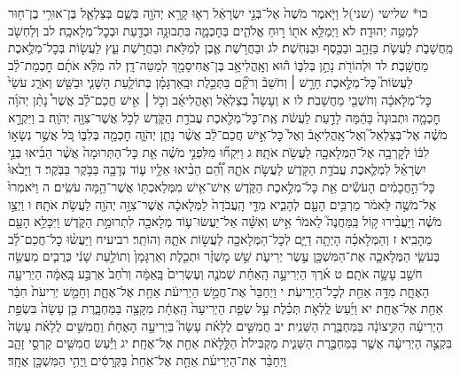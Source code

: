 \documentclass[twoside, openany, parskip=half, 11pt]{book}
\begin{document}
כו* שלישי (שני)ל וַיֹּ֤אמֶר מֹשֶׁה֙ אֶל־בְּנֵ֣י יִשְׂרָאֵ֔ל רְא֛וּ קָרָ֥א יְהֹוָ֖ה בְּשֵׁ֑ם בְּצַלְאֵ֛ל בֶּן־אוּרִ֥י בֶן־ח֖וּר לְמַטֵּ֥ה יְהוּדָֽה׃ לא וַיְמַלֵּ֥א אֹת֖וֹ ר֣וּחַ אֱלֹהִ֑ים בְּחׇכְמָ֛ה בִּתְבוּנָ֥ה וּבְדַ֖עַת וּבְכׇל־מְלָאכָֽה׃ לב וְלַחְשֹׁ֖ב מַֽחֲשָׁבֹ֑ת לַעֲשֹׂ֛ת בַּזָּהָ֥ב וּבַכֶּ֖סֶף וּבַנְּחֹֽשֶׁת׃ לג וּבַחֲרֹ֥שֶׁת אֶ֛בֶן לְמַלֹּ֖את וּבַחֲרֹ֣שֶׁת עֵ֑ץ לַעֲשׂ֖וֹת בְּכׇל־מְלֶ֥אכֶת מַחֲשָֽׁבֶת׃ לד וּלְהוֹרֹ֖ת נָתַ֣ן בְּלִבּ֑וֹ ה֕וּא וְאׇֽהֳלִיאָ֥ב בֶּן־אֲחִיסָמָ֖ךְ לְמַטֵּה־דָֽן׃ לה מִלֵּ֨א אֹתָ֜ם חׇכְמַת־לֵ֗ב לַעֲשׂוֹת֮ כׇּל־מְלֶ֣אכֶת חָרָ֣שׁ ׀ וְחֹשֵׁב֒ וְרֹקֵ֞ם בַּתְּכֵ֣לֶת וּבָֽאַרְגָּמָ֗ן בְּתוֹלַ֧עַת הַשָּׁנִ֛י וּבַשֵּׁ֖שׁ וְאֹרֵ֑ג עֹשֵׂי֙ כׇּל־מְלָאכָ֔ה וְחֹשְׁבֵ֖י מַחֲשָׁבֹֽת׃ לו א וְעָשָׂה֩ בְצַלְאֵ֨ל וְאׇהֳלִיאָ֜ב וְכֹ֣ל ׀ אִ֣ישׁ חֲכַם־לֵ֗ב אֲשֶׁר֩ נָתַ֨ן יְהֹוָ֜ה חׇכְמָ֤ה וּתְבוּנָה֙ בָּהֵ֔מָּה לָדַ֣עַת לַעֲשֹׂ֔ת אֶֽת־כׇּל־מְלֶ֖אכֶת עֲבֹדַ֣ת הַקֹּ֑דֶשׁ לְכֹ֥ל אֲשֶׁר־צִוָּ֖ה יְהֹוָֽה׃ ב וַיִּקְרָ֣א מֹשֶׁ֗ה אֶל־בְּצַלְאֵל֮ וְאֶל־אׇֽהֳלִיאָב֒ וְאֶל֙ כׇּל־אִ֣ישׁ חֲכַם־לֵ֔ב אֲשֶׁ֨ר נָתַ֧ן יְהֹוָ֛ה חׇכְמָ֖ה בְּלִבּ֑וֹ כֹּ֚ל אֲשֶׁ֣ר נְשָׂא֣וֹ לִבּ֔וֹ לְקׇרְבָ֥ה אֶל־הַמְּלָאכָ֖ה לַעֲשֹׂ֥ת אֹתָֽהּ׃ ג וַיִּקְח֞וּ מִלִּפְנֵ֣י מֹשֶׁ֗ה אֵ֤ת כׇּל־הַתְּרוּמָה֙ אֲשֶׁ֨ר הֵבִ֜יאוּ בְּנֵ֣י יִשְׂרָאֵ֗ל לִמְלֶ֛אכֶת עֲבֹדַ֥ת הַקֹּ֖דֶשׁ לַעֲשֹׂ֣ת אֹתָ֑הּ וְ֠הֵ֠ם הֵבִ֨יאוּ אֵלָ֥יו ע֛וֹד נְדָבָ֖ה בַּבֹּ֥קֶר בַּבֹּֽקֶר׃ ד וַיָּבֹ֙אוּ֙ כׇּל־הַ֣חֲכָמִ֔ים הָעֹשִׂ֕ים אֵ֖ת כׇּל־מְלֶ֣אכֶת הַקֹּ֑דֶשׁ אִֽישׁ־אִ֥ישׁ מִמְּלַאכְתּ֖וֹ אֲשֶׁר־הֵ֥מָּה עֹשִֽׂים׃ ה וַיֹּאמְרוּ֙ אֶל־מֹשֶׁ֣ה לֵּאמֹ֔ר מַרְבִּ֥ים הָעָ֖ם לְהָבִ֑יא מִדֵּ֤י הָֽעֲבֹדָה֙ לַמְּלָאכָ֔ה אֲשֶׁר־צִוָּ֥ה יְהֹוָ֖ה לַעֲשֹׂ֥ת אֹתָֽהּ׃ ו וַיְצַ֣ו מֹשֶׁ֗ה וַיַּעֲבִ֨ירוּ ק֥וֹל בַּֽמַּחֲנֶה֮ לֵאמֹר֒ אִ֣ישׁ וְאִשָּׁ֗ה אַל־יַעֲשׂוּ־ע֛וֹד מְלָאכָ֖ה לִתְרוּמַ֣ת הַקֹּ֑דֶשׁ וַיִּכָּלֵ֥א הָעָ֖ם מֵהָבִֽיא׃ ז וְהַמְּלָאכָ֗ה הָיְתָ֥ה דַיָּ֛ם לְכׇל־הַמְּלָאכָ֖ה לַעֲשׂ֣וֹת אֹתָ֑הּ וְהוֹתֵֽר׃
רביעיח וַיַּעֲשׂ֨וּ כׇל־חֲכַם־לֵ֜ב בְּעֹשֵׂ֧י הַמְּלָאכָ֛ה אֶת־הַמִּשְׁכָּ֖ן עֶ֣שֶׂר יְרִיעֹ֑ת שֵׁ֣שׁ מׇשְׁזָ֗ר וּתְכֵ֤לֶת וְאַרְגָּמָן֙ וְתוֹלַ֣עַת שָׁנִ֔י כְּרֻבִ֛ים מַעֲשֵׂ֥ה חֹשֵׁ֖ב עָשָׂ֥ה אֹתָֽם׃ ט אֹ֜רֶךְ הַיְרִיעָ֣ה הָֽאַחַ֗ת שְׁמֹנֶ֤ה וְעֶשְׂרִים֙ בָּֽאַמָּ֔ה וְרֹ֙חַב֙ אַרְבַּ֣ע בָּֽאַמָּ֔ה הַיְרִיעָ֖ה הָאֶחָ֑ת מִדָּ֥ה אַחַ֖ת לְכׇל־הַיְרִיעֹֽת׃ י וַיְחַבֵּר֙ אֶת־חֲמֵ֣שׁ הַיְרִיעֹ֔ת אַחַ֖ת אֶל־אֶחָ֑ת וְחָמֵ֤שׁ יְרִיעֹת֙ חִבַּ֔ר אַחַ֖ת אֶל־אֶחָֽת׃ יא וַיַּ֜עַשׂ לֻֽלְאֹ֣ת תְּכֵ֗לֶת עַ֣ל שְׂפַ֤ת הַיְרִיעָה֙ הָֽאֶחָ֔ת מִקָּצָ֖ה בַּמַּחְבָּ֑רֶת כֵּ֤ן עָשָׂה֙ בִּשְׂפַ֣ת הַיְרִיעָ֔ה הַקִּ֣יצוֹנָ֔ה בַּמַּחְבֶּ֖רֶת הַשֵּׁנִֽית׃ יב חֲמִשִּׁ֣ים לֻלָאֹ֗ת עָשָׂה֮ בַּיְרִיעָ֣ה הָאֶחָת֒ וַחֲמִשִּׁ֣ים לֻלָאֹ֗ת עָשָׂה֙ בִּקְצֵ֣ה הַיְרִיעָ֔ה אֲשֶׁ֖ר בַּמַּחְבֶּ֣רֶת הַשֵּׁנִ֑ית מַקְבִּילֹת֙ הַלֻּ֣לָאֹ֔ת אַחַ֖ת אֶל־אֶחָֽת׃ יג וַיַּ֕עַשׂ חֲמִשִּׁ֖ים קַרְסֵ֣י זָהָ֑ב וַיְחַבֵּ֨ר אֶת־הַיְרִיעֹ֜ת אַחַ֤ת אֶל־אַחַת֙ בַּקְּרָסִ֔ים וַֽיְהִ֥י הַמִּשְׁכָּ֖ן אֶחָֽד׃
\end{document}
